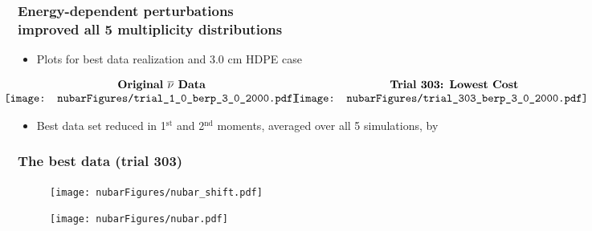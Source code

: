 \begin{frame}
\frametitle{Energy-dependent \nubar perturbations   \\ improved all 5 multiplicity
distributions}
\begin{itemize}
    \item Plots for best data realization and 3.0 cm HDPE case
\end{itemize}
\begin{center}
$\begin{array}{cc} \textbf{Original \nubar Data} & \hspace{0.13in}\textbf{Trial 303: Lowest Cost} \\
   \hspace{-0.25in}
\texttt{[image: nubarFigures/trial\_1\_0\_berp\_3\_0\_2000.pdf]} &
\hspace{-0.2in}\texttt{[image: nubarFigures/trial\_303\_berp\_3\_0\_2000.pdf]} \\
\end{array}$
\begin{itemize} 
	\item Best data set reduced  in {1$^{\text{st}}$} and {2$^{\text{nd}}$} moments, averaged over all 5 simulations, by 
\end{itemize}
\end{center}
\end{frame}

\begin{frame}
\frametitle{The best \nubar data (trial 303) }
\begin{minipage}{0.49\textwidth}
\begin{figure}[h!]
\centering
\texttt{[image: nubarFigures/nubar\_shift.pdf]}
\end{figure}
\end{minipage}
\begin{minipage}{0.49\textwidth}
\begin{figure}[h!]
\centering
\texttt{[image: nubarFigures/nubar.pdf]}
\end{figure}
\end{minipage}
\end{frame} 


\logo{}

